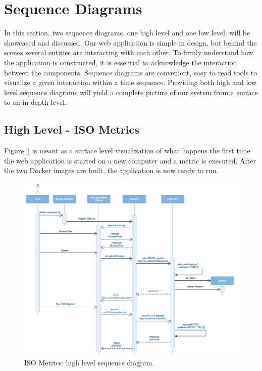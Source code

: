 \section{Sequence Diagrams}
\label{sec:sequenceDiagram}
In this section, two sequence diagrams, one high level and one low level, will be showcased and discussed. Our web application is simple in design, but behind the scenes several entities are interacting with each other. To firmly understand how the application is constructed, it is essential to acknowledge the interaction between the components. Sequence diagrams are convenient, easy to read tools to visualize a given interaction within a time sequence. Providing both high and low level sequence diagrams will yield a complete picture of our system from a surface to an in-depth level.

\subsection{High Level - ISO Metrics}
Figure \ref{fig:highlevel} is meant as a surface level visualization of what happens the first time the web application is started on a new computer and a metric is executed. After the two Docker images are built, the application is now ready to run. 

\begin{figure}[h]
    \centering
    \includegraphics[width=1\textwidth]{figures/HighLevel.png}
    \caption{ISO Metrics: high level sequence diagram.}
    \label{fig:highlevel}
\end{figure}


